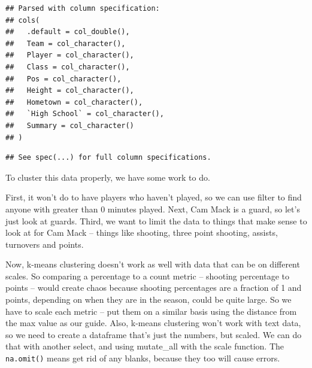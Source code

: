 \documentclass[]{book}
\newenvironment{Shaded}{\begin{snugshade}}{\end{snugshade}}
\newcommand{\DataTypeTok}[1]{\textcolor[rgb]{0.13,0.29,0.53}{#1}}
\newcommand{\DecValTok}[1]{\textcolor[rgb]{0.00,0.00,0.81}{#1}}
\newcommand{\KeywordTok}[1]{\textcolor[rgb]{0.13,0.29,0.53}{\textbf{#1}}}
\newcommand{\NormalTok}[1]{#1}
\newcommand{\OperatorTok}[1]{\textcolor[rgb]{0.81,0.36,0.00}{\textbf{#1}}}
\newcommand{\StringTok}[1]{\textcolor[rgb]{0.31,0.60,0.02}{#1}}
\begin{document}
\begin{verbatim}
## Parsed with column specification:
## cols(
##   .default = col_double(),
##   Team = col_character(),
##   Player = col_character(),
##   Class = col_character(),
##   Pos = col_character(),
##   Height = col_character(),
##   Hometown = col_character(),
##   `High School` = col_character(),
##   Summary = col_character()
## )
\end{verbatim}

\begin{verbatim}
## See spec(...) for full column specifications.
\end{verbatim}

To cluster this data properly, we have some work to do.

First, it won't do to have players who haven't played, so we can use filter to find anyone with greater than 0 minutes played. Next, Cam Mack is a guard, so let's just look at guards. Third, we want to limit the data to things that make sense to look at for Cam Mack -- things like shooting, three point shooting, assists, turnovers and points.

\begin{Shaded}
\end{Shaded}

Now, k-means clustering doesn't work as well with data that can be on different scales. So comparing a percentage to a count metric -- shooting percentage to points -- would create chaos because shooting percentages are a fraction of 1 and points, depending on when they are in the season, could be quite large. So we have to scale each metric -- put them on a similar basis using the distance from the max value as our guide. Also, k-means clustering won't work with text data, so we need to create a dataframe that's just the numbers, but scaled. We can do that with another select, and using mutate\_all with the scale function. The \texttt{na.omit()} means get rid of any blanks, because they too will cause errors.
\end{document}
